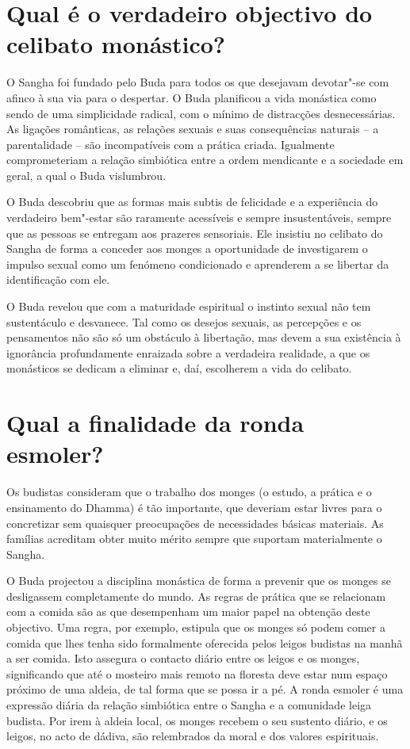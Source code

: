 \section{Qual é o verdadeiro objectivo do celibato monástico?}

O Sangha foi fundado pelo Buda para todos os que desejavam devotar"-se
com afinco à sua via para o despertar. O Buda planificou a vida
monástica como sendo de uma simplicidade radical, com o mínimo de
distracções desnecessárias. As ligações românticas, as relações sexuais
e suas consequências naturais -- a parentalidade -- são incompatíveis
com a prática criada. Igualmente comprometeriam a relação simbiótica
entre a ordem mendicante e a sociedade em geral, a qual o Buda
vislumbrou.

O Buda descobriu que as formas mais subtis de felicidade e a experiência
do verdadeiro bem"-estar são raramente acessíveis e sempre
insustentáveis, sempre que as pessoas se entregam aos prazeres
sensoriais. Ele insistiu no celibato do Sangha de forma a conceder aos
monges a oportunidade de investigarem o impulso sexual como um fenómeno
condicionado e aprenderem a se libertar da identificação com ele.

O Buda revelou que com a maturidade espiritual o instinto sexual não tem
sustentáculo e desvanece. Tal como os desejos sexuais, as percepções e
os pensamentos não são só um obstáculo à libertação, mas devem a sua
existência à ignorância profundamente enraizada sobre a verdadeira
realidade, a que os monásticos se dedicam a eliminar e, daí, escolherem a
vida do celibato.

\section{Qual a finalidade da ronda esmoler?}

Os budistas consideram que o trabalho dos monges (o estudo, a prática e
o ensinamento do Dhamma) é tão importante, que deveriam estar livres
para o concretizar sem quaisquer preocupações de necessidades básicas
materiais. As famílias acreditam obter muito mérito sempre que suportam
materialmente o Sangha.

O Buda projectou a disciplina monástica de forma a prevenir que os
monges se desligassem completamente do mundo. As regras de prática que
se relacionam com a comida são as que desempenham um maior papel na
obtenção deste objectivo. Uma regra, por exemplo, estipula que os monges
só podem comer a comida que lhes tenha sido formalmente oferecida pelos
leigos budistas na manhã a ser comida. Isto assegura o contacto diário
entre os leigos e os monges, significando que até o mosteiro mais remoto
na floresta deve estar num espaço próximo de uma aldeia, de tal forma
que se possa ir a pé. A ronda esmoler é uma expressão diária da relação
simbiótica entre o Sangha e a comunidade leiga budista. Por irem à
aldeia local, os monges recebem o seu sustento diário, e os leigos, no
acto de dádiva, são relembrados da moral e dos valores espirituais.

